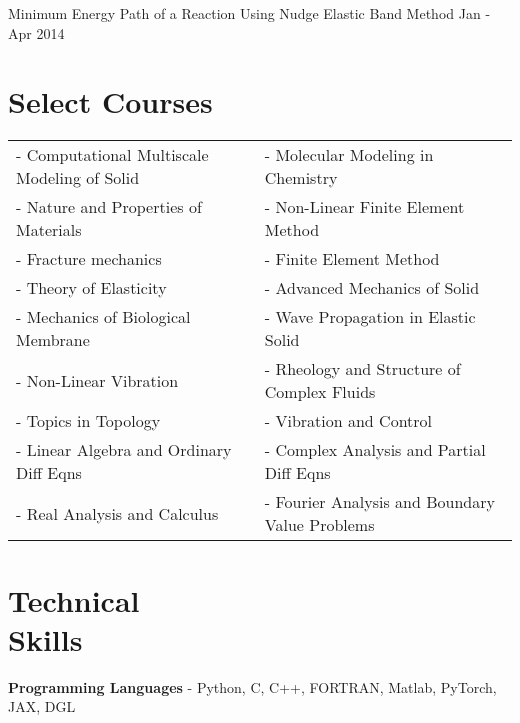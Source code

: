 \documentclass[margin,line]{resume}
\begin{document}
\begin{resume}
    \vspace{-0.3cm}
    Minimum Energy Path of a Reaction Using Nudge Elastic Band Method \hfill \small{Jan - Apr 2014}




    \section{\mysidestyle Select Courses}

    \begin{tabular}{@{}p{7.5cm}p{7.5cm}}
        - Computational Multiscale Modeling of Solid & - Molecular Modeling in Chemistry              \\
        - Nature and Properties of Materials         & -  Non-Linear Finite Element Method            \\
        - Fracture mechanics                         & - Finite Element Method                        \\
        - Theory of Elasticity                       & - Advanced Mechanics of Solid                  \\
        - Mechanics of Biological Membrane           & - Wave Propagation in Elastic Solid            \\
        - Non-Linear Vibration                       & -	Rheology and Structure of Complex Fluids     \\
        - Topics in Topology                         & - Vibration and Control                        \\
        - Linear Algebra and Ordinary Diff Eqns      & - Complex Analysis and Partial Diff Eqns       \\
        - Real Analysis and Calculus                 & - Fourier Analysis and Boundary Value Problems
    \end{tabular}

    \section{\mysidestyle Technical \\Skills}
    \textbf{\textsf{Programming Languages}} - Python, C, C++,  FORTRAN, Matlab, PyTorch, JAX, DGL


\end{resume}
\end{document}

